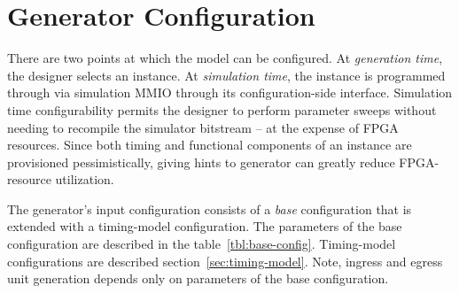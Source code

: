 \section{Generator Configuration}\label{sec:generator-parameters}

There are two points at which the model can be configured.  At
\textit{generation time}, the designer selects an instance. At
\textit{simulation time}, the instance is programmed through via simulation
MMIO through its configuration-side interface. Simulation time configurability
permits the designer to perform parameter sweeps without needing to recompile
the simulator bitstream -- at the expense of FPGA resources. Since both timing
and functional components of an instance are provisioned pessimistically,
giving hints to generator can greatly reduce FPGA-resource utilization.

The generator's input configuration consists of a \emph{base} configuration
that is extended with a timing-model configuration. The parameters of the base
configuration are described in the table~\ref{tbl:base-config}. Timing-model
configurations are described section~\ref{sec:timing-model}. Note, ingress and
egress unit generation depends only on parameters of the base configuration.

\begin{table}
\begin{center}
\end{center}
\caption{Generator base configuration parameters.}
\label{tbl:base-config}
\end{table}%

